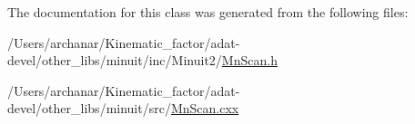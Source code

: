 The documentation for this class was generated from the following files\+:\begin{DoxyCompactItemize}
\item 
/\+Users/archanar/\+Kinematic\+\_\+factor/adat-\/devel/other\+\_\+libs/minuit/inc/\+Minuit2/\mbox{\hyperlink{adat-devel_2other__libs_2minuit_2inc_2Minuit2_2MnScan_8h}{Mn\+Scan.\+h}}\item 
/\+Users/archanar/\+Kinematic\+\_\+factor/adat-\/devel/other\+\_\+libs/minuit/src/\mbox{\hyperlink{adat-devel_2other__libs_2minuit_2src_2MnScan_8cxx}{Mn\+Scan.\+cxx}}\end{DoxyCompactItemize}
